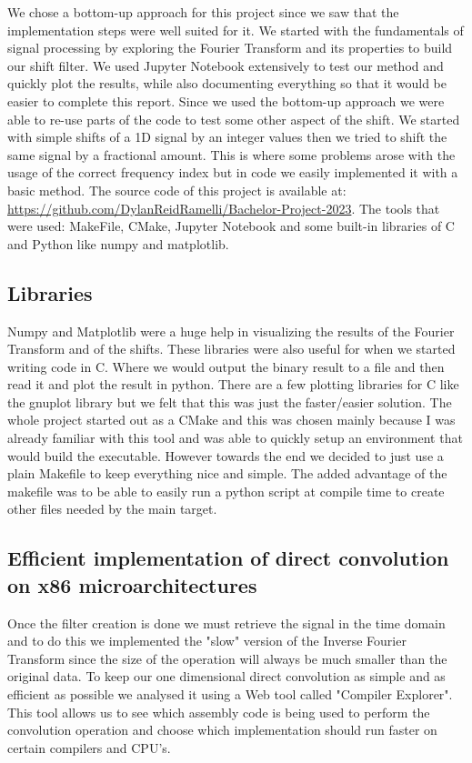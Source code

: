 \documentclass[]{usiinfbachelorproject}
\begin{document}
		We chose a bottom-up approach for this project since we saw that the implementation steps were well suited for it. 
		We started with the fundamentals of signal processing by exploring the Fourier Transform and its properties to build our shift filter. We used Jupyter Notebook extensively to test our method and quickly plot the results, while also documenting everything so that it would be easier to complete this report. Since we used the bottom-up approach we were able to re-use parts of the code to test some other aspect of the shift. We started with simple shifts of a 1D signal by an integer values then we tried to shift the same signal by a fractional amount. This is where some problems arose with the usage of the correct frequency index but in code we easily implemented it with a basic method. The source code of this project is available at: \url{https://github.com/DylanReidRamelli/Bachelor-Project-2023}.
		The tools that were used: MakeFile, CMake, Jupyter Notebook and some built-in libraries of C and Python like numpy and matplotlib.
		
	\subsection{Libraries}
		Numpy and Matplotlib were a huge help in visualizing the results of the Fourier Transform and of the shifts. These libraries were also useful for when we started writing code in C. Where we would output the binary result to a file and then read it and plot the result in python. There are a few plotting libraries for C like the gnuplot library but we felt that this was just the faster/easier solution.
		The whole project started out as a CMake and this was chosen mainly because I was already familiar with this tool and was able to quickly setup an environment that would build the executable. However towards the end we decided to just use a plain Makefile to keep everything nice and simple. The added advantage of the makefile was to be able to easily run a python script at compile time to create other files needed by the main target. 
		 
		
		\subsection{Efficient implementation of direct convolution on x86 microarchitectures}
		Once the filter creation is done we must retrieve the signal in the time domain and to do this we implemented the "slow" version of the Inverse Fourier Transform since the size of the operation will always be much smaller than the original data.
		To keep our one dimensional direct convolution as simple and as efficient as possible we analysed it using a Web tool called "Compiler Explorer"\cite{godbolt}. This tool allows us to see which assembly code is being used to perform the convolution operation and choose which implementation should run faster on certain compilers and CPU's.
		
\end{document}
